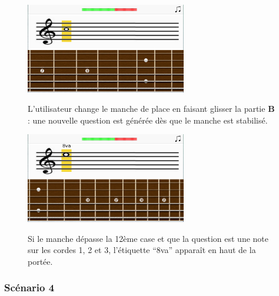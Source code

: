 \documentclass{scrreprt}
\begin{document}
\begin{figure}[!ht]
  \begin{minipage}{0.55\linewidth}
    \includegraphics[width=7cm]{images/maquette_usecase/portee/question_changement_manche.png}
  \end{minipage}\hfill
 \begin{minipage}{0.5\linewidth}
  {L'utilisateur change le manche de place en faisant glisser la partie \textbf{B} : une nouvelle question est générée dès que le manche est stabilisé.}
  \end{minipage}
\end{figure}

\bigbreak


\begin{figure}[!ht]
  \begin{minipage}{0.55\linewidth}
    \includegraphics[width=7cm]{images/maquette_usecase/portee/8va.png}
  \end{minipage}\hfill
 \begin{minipage}{0.5\linewidth}
  {Si le manche dépasse la 12ème case et que la question est une note sur les cordes 1, 2 et 3, l'étiquette \enquote{8va} apparaît en haut de la portée.}
   \end{minipage}
\end{figure}

\bigbreak


\subsubsection{Scénario 4}
\bigbreak
\end{document}

